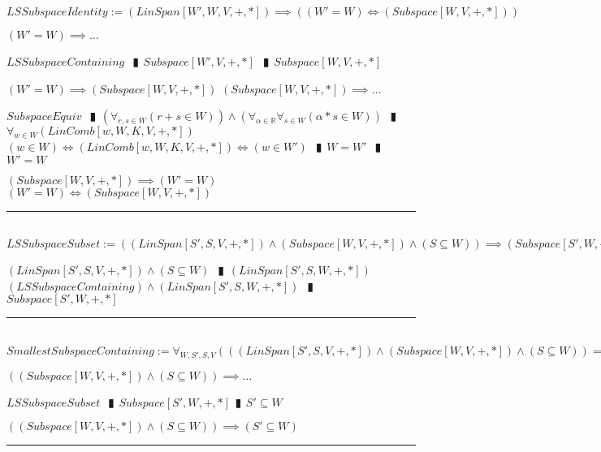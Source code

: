 \documentclass{book}
\newcommand{\abr}{:=}
\newcommand{\pipe}{$\phantom{(}\vrectangleblack\phantom{)}$}
\begin{document}
$LSSubspaceIdentity \abr (LinSpan[W', W, V, +, *]) \implies ((W' = W) \iff (Subspace[W, V, +, *]))$
\begin{enumerate}
  \lit $(W' = W) \implies \ldots$
  \begin{enumerate}
    \lit $LSSubspaceContaining$ \pipe $Subspace[W', V, +, *]$ \pipe $Subspace[W, V, +, *]$
  \end{enumerate}
  \lit $(W' = W) \implies (Subspace[W, V, +, *])$
  \lit $(Subspace[W, V, +, *]) \implies \ldots$
  \begin{enumerate}
    \lit $SubspaceEquiv$ \pipe $(\forall_{r, s \in W}(r + s \in W)) \land (\forall_{\alpha \in \mathbb{R}} \forall_{s \in W}(\alpha * s \in W))$ \pipe $\forall_{w \in W}(LinComb[w, W, K, V, +, *])$
    \lit $(w \in W) \iff (LinComb[w, W, K, V, +, *]) \iff (w \in W')$ \pipe $W = W'$ \pipe $W' = W$
  \end{enumerate}
  \lit $(Subspace[W, V, +, *]) \implies (W' = W)$
  \lit $(W' = W) \iff (Subspace[W, V, +, *])$
\end{enumerate} \vspace{.75mm} \hrule \vspace{.75mm} \ \\ 

$LSSubspaceSubset \abr ((LinSpan[S', S, V, +, *]) \land (Subspace[W, V, +, *]) \land (S \subseteq W)) \implies (Subspace[S', W, +, *])$
\begin{enumerate}
  \lit $(LinSpan[S', S, V, +, *]) \land (S \subseteq W)$ \pipe $(LinSpan[S', S, W, +, *])$
  \lit $(LSSubspaceContaining) \land (LinSpan[S', S, W, +, *])$ \pipe $Subspace[S', W, +, *]$
\end{enumerate} \vspace{.75mm} \hrule \vspace{.75mm} \ \\ 

$SmallestSubspaceContaining \abr \forall_{W, S', S, V}(((LinSpan[S', S, V, +, *]) \land (Subspace[W, V, +, *]) \land (S \subseteq W)) \implies (S' \subseteq W))$
\begin{enumerate}
  \lit $((Subspace[W, V, +, *]) \land (S \subseteq W)) \implies \ldots$
  \begin{enumerate}
    \lit $LSSubspaceSubset$ \pipe $Subspace[S', W, +, *]$\pipe $S' \subseteq W$
  \end{enumerate}
  \lit $((Subspace[W, V, +, *]) \land (S \subseteq W)) \implies (S' \subseteq W)$
\end{enumerate} \vspace{.75mm} \hrule \vspace{.75mm} \ \\ 
\end{document}
